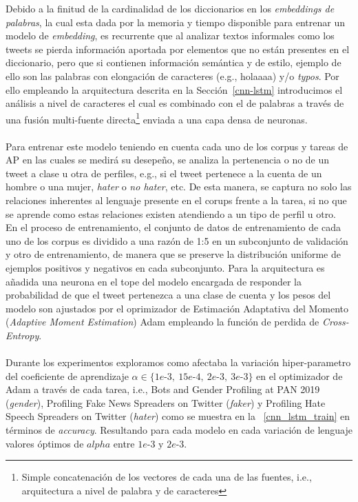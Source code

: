  	Debido a la finitud de la cardinalidad de los diccionarios en los \textit{embeddings de palabras}, la cual esta dada por la memoria y tiempo disponible para entrenar un modelo de \textit{embedding}, es recurrente que al analizar textos informales como los tweets se pierda información aportada por elementos que no están presentes en el diccionario, pero que si contienen información semántica y de estilo, ejemplo de ello son las palabras con elongación de caracteres (e.g., holaaaa) y/o \textit{typos}. Por ello empleando la arquitectura descrita en la Sección~\ref{cnn-lstm} introducimos el análisis a nivel de caracteres el cual es combinado con el de palabras a través de una fusión multi-fuente directa\footnote{Simple concatenación de los vectores de cada una de las fuentes, i.e., arquitectura a nivel de palabra y de caracteres} enviada a una capa densa de neuronas.
 	\\\\
 	Para entrenar este modelo teniendo en cuenta cada uno de los corpus y tareas de AP en las cuales se medirá su desepeño, se analiza la pertenencia o no de un tweet a clase u otra de perfiles, e.g., si el tweet pertenece a la cuenta de un hombre o una mujer, \textit{hater }o \textit{no hater}, etc. De esta manera, se captura no solo las relaciones inherentes al lenguaje presente en el corups frente a la tarea, si no que se aprende como estas relaciones existen atendiendo a un tipo de perfil u otro.
 	\\
 	En el proceso de entrenamiento, el conjunto de datos de entrenamiento de cada uno de los corpus es dividido a una razón de 1:5 en un subconjunto de validación y otro de entrenamiento, de manera que se preserve la distribución uniforme de ejemplos positivos y negativos en cada subconjunto.
 	Para la arquitectura es añadida una neurona en el tope del modelo encargada de responder la probabilidad de que el tweet pertenezca a una clase de cuenta y los pesos del modelo son ajustados por el oprimizador de Estimación Adaptativa del Momento (\textit{Adaptive Moment Estimation}) Adam \citep{DBLP:journals/corr/KingmaB14} empleando la función de perdida de \textit{Cross-Entropy}.  	\\\\
 	Durante los experimentos exploramos como afectaba la variación hiper-parametro del coeficiente de aprendizaje $\alpha \in \{1e\text{-}3,~15e\text{-}4,~2e\text{-}3,~3e\text{-}3\}$  en el optimizador de Adam a través de cada tarea, i.e., Bots and Gender Profiling at PAN 2019 (\textit{gender}), Profiling Fake News Spreaders on Twitter (\textit{faker}) y Profiling Hate Speech Spreaders on Twitter (\textit{hater}) como se muestra en la \tablename~\ref{cnn_lstm_train} en términos de \textit{accuracy}. Resultando para cada modelo en cada variación de lenguaje valores óptimos de  $alpha$ entre $1e\text{-}3\text{ y }2e\text{-}3$.
